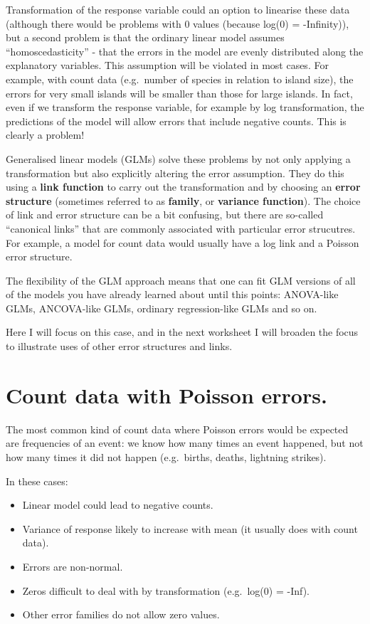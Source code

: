 \documentclass[
  a4paperpaper,
]{book}
\providecommand{\tightlist}{%
  \setlength{\itemsep}{0pt}\setlength{\parskip}{0pt}}
\begin{document}
Transformation of the response variable could an option to linearise these data (although there would be problems with 0 values (because log(0) = -Infinity)), but a second problem is that the ordinary linear model assumes ``homoscedasticity'' - that the errors in the model are evenly distributed along the explanatory variables. This assumption will be violated in most cases. For example, with count data (e.g.~number of species in relation to island size), the errors for very small islands will be smaller than those for large islands. In fact, even if we transform the response variable, for example by log transformation, the predictions of the model will allow errors that include negative counts. This is clearly a problem!

Generalised linear models (GLMs) solve these problems by not only applying a transformation but also explicitly altering the error assumption. They do this using a \textbf{link function} to carry out the transformation and by choosing an \textbf{error structure} (sometimes referred to as \textbf{family}, or \textbf{variance function}). The choice of link and error structure can be a bit confusing, but there are so-called ``canonical links'' that are commonly associated with particular error strucutres. For example, a model for count data would usually have a log link and a Poisson error structure.

The flexibility of the GLM approach means that one can fit GLM versions of all of the models you have already learned about until this points: ANOVA-like GLMs, ANCOVA-like GLMs, ordinary regression-like GLMs and so on.

Here I will focus on this case, and in the next worksheet I will broaden the focus to illustrate uses of other error structures and links.

\hypertarget{count-data-with-poisson-errors.}{%
\section{Count data with Poisson errors.}\label{count-data-with-poisson-errors.}}

The most common kind of count data where Poisson errors would be expected are frequencies of an event: we know how many times an event happened, but not how many times it did not happen (e.g.~births, deaths, lightning strikes).

In these cases:

\begin{itemize}
\tightlist
\item
  Linear model could lead to negative counts.
\item
  Variance of response likely to increase with mean (it usually does with count data).
\item
  Errors are non-normal.
\item
  Zeros difficult to deal with by transformation (e.g.~log(0) = -Inf).
\item
  Other error families do not allow zero values.
\end{itemize}
\end{document}
